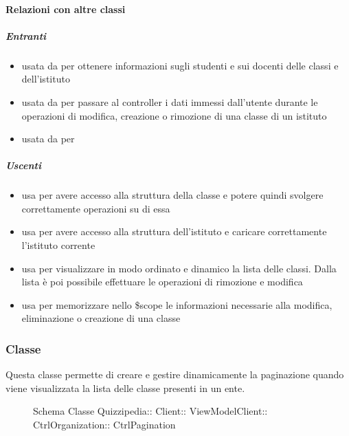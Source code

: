 \paragraph{Relazioni con altre classi}
\subparagraph{Entranti}
\begin{itemize}
\item usata da  per ottenere informazioni sugli studenti e sui docenti delle classi e dell'istituto
\item usata da  per passare al controller i dati immessi dall'utente durante le operazioni di modifica, creazione o rimozione di una classe di un istituto
\item usata da  per 
\end{itemize}
\subparagraph{Uscenti}
\begin{itemize}
\item usa  per avere
accesso alla struttura della classe e potere quindi svolgere correttamente operazioni su di
essa
\item usa  per avere accesso alla struttura dell'istituto e caricare correttamente l'istituto corrente
\item usa  per visualizzare in modo ordinato e dinamico la lista delle classi. Dalla lista è poi possibile effettuare le operazioni di rimozione e modifica
\item usa  per memorizzare nello \$scope le informazioni necessarie alla modifica, eliminazione o creazione di una classe
\end{itemize}
\subsubsection{Classe }
Questa classe permette di creare e gestire dinamicamente la paginazione quando viene visualizzata la lista delle classe presenti in un ente.
\begin{figure}[H]
\centering
\noindent{}
\caption[Schema Classe CtrlPagination]{Schema Classe Quizzipedia:: Client:: ViewModelClient:: CtrlOrganization:: CtrlPagination}
\end{figure}
